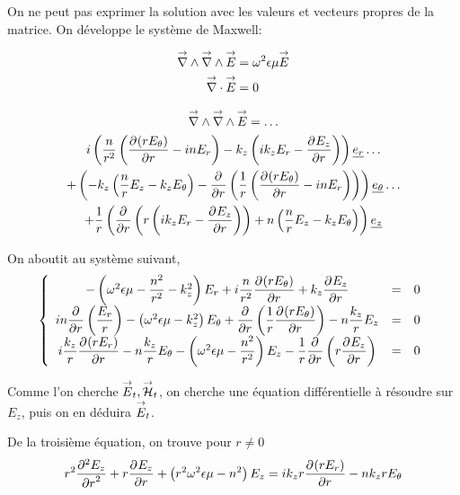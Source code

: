 On ne peut pas exprimer la solution avec les valeurs et vecteurs propres de la matrice. 
On développe le système de Maxwell:

\begin{align}
    \vrot \vrot \vE &= \w^2\eps\mu \vE
    \\
    \vdiv \vE &= 0
\end{align}

\begin{multline}
    \vrot \vrot \vE = \dots\\
    i\left(\frac{n}{r^2}\left(\ddr{r}{(rE_\theta)} - inE_r\right) - k_z\left(ik_zE_r - \ddr{r}{E_z}\right)\right)    \v{e_r} \dots\\ 
    + \left(-k_z\left(\frac{n}{r}E_z - k_zE_\theta\right) -\ddr{r}{}\left(\frac{1}{r}\left(\ddr{r}{(rE_\theta)}-inE_r\right)\right)\right)    \v{e_\theta} \dots\\
    + \frac{1}{r}\left(\ddr{r}{} \left(r\left(ik_zE_r - \ddr{r}{E_z}\right)\right) + n \left(\frac{n}{r}E_z - k_zE_\theta\right)\right) \v{e_z}
\end{multline}

On aboutit au système suivant,
\begin{equation}
    \left\lbrace
    \begin{array}{ccc}
        -\left(\w^2\eps\mu -\frac{n^2}{r^2}  - k_z^2\right)E_r  +i\frac{n}{r^2}\ddr{r}{(rE_\theta)}  +k_z\ddr{r}{E_z} & = & 0\\
        in\ddr{r}{}\left(\frac{E_r}{r}\right) -\left(\w^2\eps\mu - k_z^2\right)E_\theta + \ddr{r}{}\left(\frac{1}{r}\ddr{r}{(rE_\theta)}\right)  - n\frac{k_z}{r}E_z & = & 0\\
        i\frac{k_z}{r}\ddr{r}{(rE_r)}  - n\frac{k_z}{r}E_\theta  -\left(\w^2\eps\mu - \frac{n^2}{r^2} \right)E_z - \frac{1}{r}\ddr{r}{}\left(r\ddr{r}{E_z}\right) & = & 0
    \end{array}
    \right.
\end{equation}

Comme l'on cherche $\vE_t, \vH_t$, on cherche une équation différentielle à résoudre sur $E_z$, puis on en déduira $\vE_t$.

De la troisième  équation, on trouve pour $r\not=0$
\begin{equation}
r^2 \ddr[2]{r}{E_z} + r\ddr{r}{E_z} + \left(r^2\w^2\eps\mu - n^2\right)E_z =ik_zr\ddr{r}{(rE_r)} -  nk_zrE_\theta
\end{equation}

